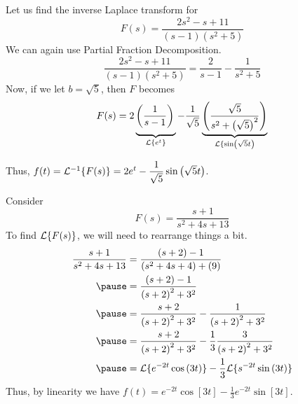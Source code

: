 \documentclass{beamer}
\begin{document}
\begin{frame}
\begin{example}
Let us find the inverse Laplace transform for
\begin{equation*}
F(s)=\dfrac{2s^2-s+11}{(s-1)(s^2+5)}
\end{equation*}\pause
We can again use Partial Fraction Decomposition.
\begin{equation*}
\dfrac{2s^2-s+11}{(s-1)(s^2+5)}=\dfrac{2}{s-1}-\dfrac{1}{s^2+5}
\end{equation*}\pause
Now, if we let $b=\sqrt{5}$, then  $F$ becomes
\begin{equation*}
F(s)=2\underbrace{\left(\dfrac{1}{s-1}\right)\vphantom{\left(\dfrac{\sqrt{5}}{s^2+{\left(\sqrt{5}\right)}^2}\right)}}_{\laplace\{e^t\}}-\dfrac{1}{\sqrt{5}}\underbrace{\left(\dfrac{\sqrt{5}}{s^2+{\left(\sqrt{5}\right)}^2}\right)}_{\laplace\{\sin[\sqrt{5} t]}
\end{equation*}\pause

\vspace{-2mm}
Thus, $f(t)=\laplace^{-1}\{F(s)\}=2e^t-\dfrac{1}{\sqrt{5}}\sin[\sqrt{5} t]$.
\end{example}
\end{frame}

\begin{frame}
\begin{example}
Consider
\begin{equation*}
F(s)=\dfrac{s+1}{s^2+4s+13}
\end{equation*}\pause
To find $\mathcal{L}\{F(s)\}$, we will need to rearrange things a bit.
\begin{equation*}
\begin{aligned}
\dfrac{s+1}{s^2+4s+13} &= \dfrac{(s+2)-1}{(s^2+4s+4)+(9)}\\\pause
&=\dfrac{(s+2)-1}{{(s+2)}^2+3^2}\\\pause
&=\dfrac{s+2}{{(s+2)}^2+3^2}-\dfrac{1}{{(s+2)}^2+3^2}\\\pause
&=\dfrac{s+2}{{(s+2)}^2+3^2}-\dfrac{1}{3}\dfrac{3}{{(s+2)}^2+3^2}\\\pause
&=\laplace\{e^{-2t}\cos[3t]\}-\dfrac{1}{3}\laplace\{s^{-2t}\sin[3t]\}
\end{aligned}
\end{equation*}\pause
Thus, by linearity we have $f(t)=e^{-2t}\cos[3t]-\tfrac{1}{3}e^{-2t}\sin[3t]$.
\end{example}
\end{frame}
\end{document}
